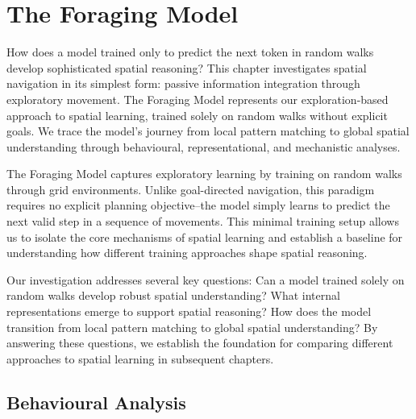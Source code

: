 \chapter{The Foraging Model}

How does a model trained only to predict the next token in random walks develop sophisticated spatial reasoning? This chapter investigates spatial navigation in its simplest form: passive information integration through exploratory movement. The Foraging Model represents our exploration-based approach to spatial learning, trained solely on random walks without explicit goals. We trace the model's journey from local pattern matching to global spatial understanding through behavioural, representational, and mechanistic analyses.

The Foraging Model captures exploratory learning by training on random walks through grid environments. Unlike goal-directed navigation, this paradigm requires no explicit planning objective--the model simply learns to predict the next valid step in a sequence of movements. This minimal training setup allows us to isolate the core mechanisms of spatial learning and establish a baseline for understanding how different training approaches shape spatial reasoning.

Our investigation addresses several key questions: Can a model trained solely on random walks develop robust spatial understanding? What internal representations emerge to support spatial reasoning? How does the model transition from local pattern matching to global spatial understanding? By answering these questions, we establish the foundation for comparing different approaches to spatial learning in subsequent chapters.



\section{Behavioural Analysis}

